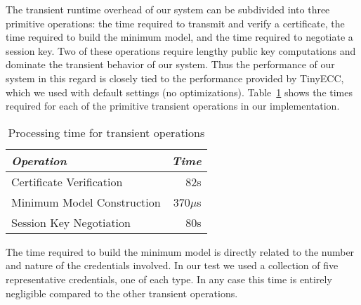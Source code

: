 The transient runtime overhead of our system can be subdivided into
three primitive operations: the time required to transmit and verify a
certificate, the time required to build the minimum model, and the
time required to negotiate a session key. Two of these operations
require lengthy public key computations and dominate the transient
behavior of our system. Thus the performance of our system in this
regard is closely tied to the performance provided by TinyECC, which
we used with default settings (no optimizations).
Table~\ref{table-transient-time} shows the times required for each of
the primitive transient operations in our implementation. 

\begin{table}[tbhp]
  \newcommand\T{\rule{0pt}{2.1ex}}
  \centering
  \caption{Processing time for transient operations}
  {
  \begin{tabular}{|l|r|} \hline
    \textit{Operation} \T & \textit{Time} \\ \hline \hline

    Certificate Verification     \T &  82s \\ \hline 
    Minimum Model Construction   \T & 370$\mu$s \\ \hline
    Session Key Negotiation      \T &  80s\\ \hline
  \end{tabular}
  }
  \label{table-transient-time}
\end{table}

The time required to build the minimum model is directly related to the
number and nature of the credentials involved. In our test we used a
collection of five representative credentials, one of each type.
In any case this time is entirely negligible compared to
the other transient operations.


